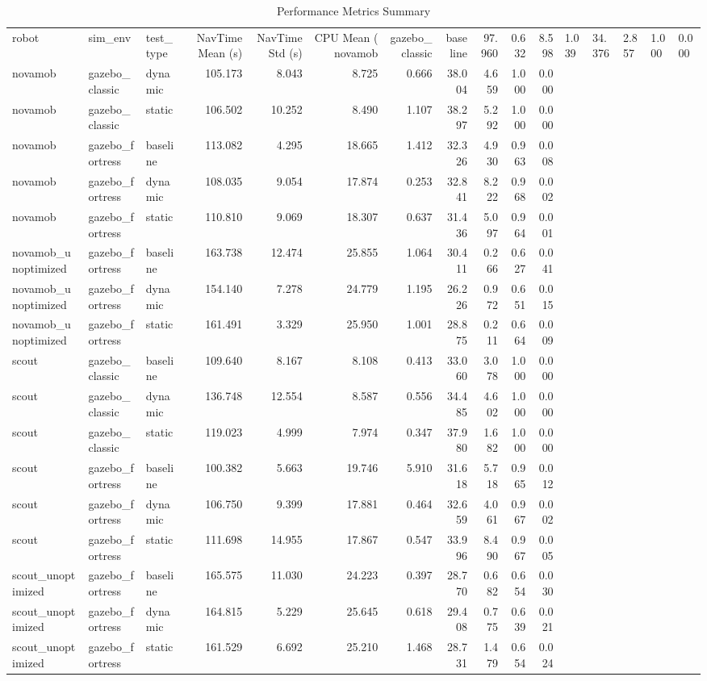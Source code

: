 \begin{table}
\caption{Performance Metrics Summary}
\label{tab:summary_results}
\begin{tabular}{lllrrrrrrrr}
\toprule
robot & sim\_env & test\_type & NavTime Mean (s) & NavTime Std (s) & CPU Mean (%
\midrule
novamob & gazebo_classic & baseline & 97.960 & 0.632 & 8.598 & 1.039 & 34.376 & 2.857 & 1.000 & 0.000 \\
novamob & gazebo_classic & dynamic & 105.173 & 8.043 & 8.725 & 0.666 & 38.004 & 4.659 & 1.000 & 0.000 \\
novamob & gazebo_classic & static & 106.502 & 10.252 & 8.490 & 1.107 & 38.297 & 5.292 & 1.000 & 0.000 \\
novamob & gazebo_fortress & baseline & 113.082 & 4.295 & 18.665 & 1.412 & 32.326 & 4.930 & 0.963 & 0.008 \\
novamob & gazebo_fortress & dynamic & 108.035 & 9.054 & 17.874 & 0.253 & 32.841 & 8.222 & 0.968 & 0.002 \\
novamob & gazebo_fortress & static & 110.810 & 9.069 & 18.307 & 0.637 & 31.436 & 5.097 & 0.964 & 0.001 \\
novamob_unoptimized & gazebo_fortress & baseline & 163.738 & 12.474 & 25.855 & 1.064 & 30.411 & 0.266 & 0.627 & 0.041 \\
novamob_unoptimized & gazebo_fortress & dynamic & 154.140 & 7.278 & 24.779 & 1.195 & 26.226 & 0.972 & 0.651 & 0.015 \\
novamob_unoptimized & gazebo_fortress & static & 161.491 & 3.329 & 25.950 & 1.001 & 28.875 & 0.211 & 0.664 & 0.009 \\
scout & gazebo_classic & baseline & 109.640 & 8.167 & 8.108 & 0.413 & 33.060 & 3.078 & 1.000 & 0.000 \\
scout & gazebo_classic & dynamic & 136.748 & 12.554 & 8.587 & 0.556 & 34.485 & 4.602 & 1.000 & 0.000 \\
scout & gazebo_classic & static & 119.023 & 4.999 & 7.974 & 0.347 & 37.980 & 1.682 & 1.000 & 0.000 \\
scout & gazebo_fortress & baseline & 100.382 & 5.663 & 19.746 & 5.910 & 31.618 & 5.718 & 0.965 & 0.012 \\
scout & gazebo_fortress & dynamic & 106.750 & 9.399 & 17.881 & 0.464 & 32.659 & 4.061 & 0.967 & 0.002 \\
scout & gazebo_fortress & static & 111.698 & 14.955 & 17.867 & 0.547 & 33.996 & 8.490 & 0.967 & 0.005 \\
scout_unoptimized & gazebo_fortress & baseline & 165.575 & 11.030 & 24.223 & 0.397 & 28.770 & 0.682 & 0.654 & 0.030 \\
scout_unoptimized & gazebo_fortress & dynamic & 164.815 & 5.229 & 25.645 & 0.618 & 29.408 & 0.775 & 0.639 & 0.021 \\
scout_unoptimized & gazebo_fortress & static & 161.529 & 6.692 & 25.210 & 1.468 & 28.731 & 1.479 & 0.654 & 0.024 \\
\bottomrule
\end{tabular}
\end{table}
